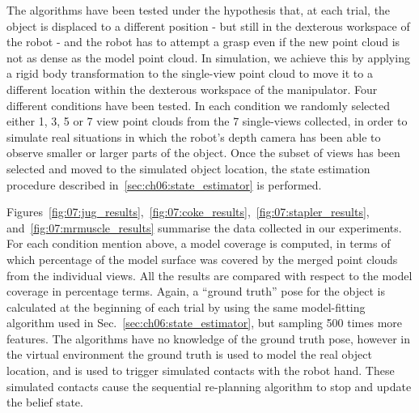 The algorithms have been tested under the hypothesis that, at each trial, the object is displaced to a different position - but still in the dexterous workspace of the robot - and the robot has to attempt a grasp even if the new point cloud is not as dense as the model point cloud. In simulation, we achieve this by applying a rigid body transformation to the single-view point cloud to move it to a different location within the dexterous workspace of the manipulator. Four different conditions have been tested. In each condition we randomly selected either 1, 3, 5 or 7 view point clouds from the 7 single-views collected, in order to simulate real situations in which the robot's depth camera has been able to observe smaller or larger parts of the object. Once the subset of views has been selected and moved to the simulated object location, the state estimation procedure described in~\ref{sec:ch06:state_estimator} is performed.   

Figures~\ref{fig:07:jug_results},~\ref{fig:07:coke_results},~\ref{fig:07:stapler_results}, and~\ref{fig:07:mrmuscle_results} summarise the data collected in our experiments. For each condition mention above, a model coverage is computed, in terms of which percentage of the model surface was covered by the merged point clouds from the individual views. All the results are compared with respect to the model coverage in percentage terms. Again, a ``ground truth'' pose for the object is calculated at the beginning of each trial by using the same model-fitting algorithm used in Sec.~\ref{sec:ch06:state_estimator}, but sampling 500 times more features. The algorithms have no knowledge of the ground truth pose, however in the virtual environment the ground truth is used to model the real object location, and is used to trigger simulated contacts with the robot hand. These simulated contacts cause the sequential re-planning algorithm to stop and update the belief state.   

